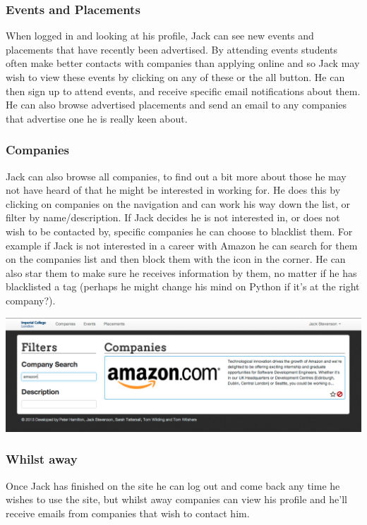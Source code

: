   \subsubsection{Events and Placements}
    When logged in and looking at his profile, Jack can see new events and placements that have recently been advertised. By attending events students often make better contacts with companies than applying online and so Jack may wish to view these events by clicking on any of these or the all button. He can then sign up to attend events, and receive specific email notifications about them.
    He can also browse advertised placements and send an email to any companies that advertise one he is really keen about.

  \subsubsection{Companies}
    Jack can also browse all companies, to find out a bit more about those he may not have heard of that he might be interested in working for. He does this by clicking on companies on the navigation and can work his way down the list, or filter by name/description.
    If Jack decides he is not interested in, or does not wish to be contacted by, specific companies he can choose to blacklist them. For example if Jack is not interested in a career with Amazon he can search for them on the companies list and then block them with the icon in the corner. He can also star them to make sure he receives information by them, no matter if he has blacklisted a tag (perhaps he might change his mind on Python if it's at the right company?).

    \includegraphics[scale=0.3]{images/user_experiences/student/block_amazon}

  \subsubsection{Whilst away}
    Once Jack has finished on the site he can log out and come back any time he wishes to use the site, but whilst away companies can view his profile and he'll receive emails from companies that wish to contact him.


